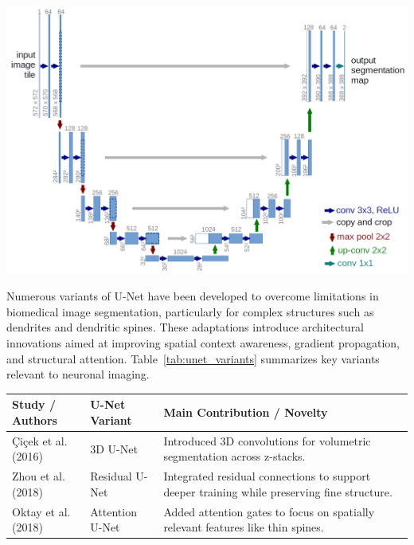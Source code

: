 \begin{center}
    \includegraphics[width=.9\textwidth]{figures/10_unet.png} 
    \label{fig:unet}
\end{center}

Numerous variants of U-Net have been developed to overcome limitations in biomedical image segmentation, particularly for complex structures such as dendrites and dendritic spines. These adaptations introduce architectural innovations aimed at improving spatial context awareness, gradient propagation, and structural attention. Table~\ref{tab:unet_variants} summarizes key variants relevant to neuronal imaging.


\begin{table}[caption={Summary of U-Net variants relevant to dendritic and spine segmentation}, label=tab:unet_variants]
    \centering
    \begin{tabular}{p{3.2cm} p{3.5cm} p{6.5cm}}
        \toprule
        \textbf{Study / Authors} & \textbf{U-Net Variant} & \textbf{Main Contribution / Novelty} \\
        \midrule
        Çiçek et al. (2016) \cite{Çiçek_2016} & 3D U-Net & Introduced 3D convolutions for volumetric segmentation across z-stacks. \\
        Zhou et al. (2018) \cite{Zhang_2018} & Residual U-Net & Integrated residual connections to support deeper training while preserving fine structure. \\
        Oktay et al. (2018) \cite{Oktay_2018} & Attention U-Net & Added attention gates to focus on spatially relevant features like thin spines. \\
        \bottomrule
    \end{tabular}
\end{table}



